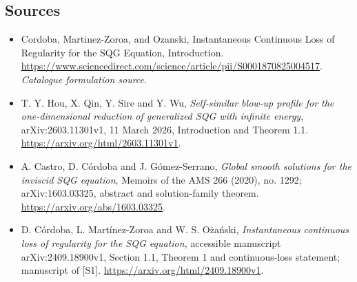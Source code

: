\documentclass[11pt,a4paper]{article}
\numberwithin{equation}{section}
\begin{document}
\subsection{Sources}
\begin{itemize}\raggedright
\item[\textnormal{[S1]}]\hypertarget{source:30006753:1}{} Cordoba, Martinez-Zoroa, and Ozanski, Instantaneous Continuous Loss of Regularity for the SQG Equation, Introduction.
\url{https://www.sciencedirect.com/science/article/pii/S0001870825004517}.
{\small\textit{Catalogue formulation source.}}
\item[\textnormal{[E1]}]\hypertarget{extra:30006753:1}{} T. Y. Hou, X. Qin,
Y. Sire and Y. Wu, \emph{Self-similar blow-up profile for the one-dimensional
reduction of generalized SQG with infinite energy}, arXiv:2603.11301v1,
11 March 2026, Introduction and Theorem 1.1.
\url{https://arxiv.org/html/2603.11301v1}.
\item[\textnormal{[E2]}]\hypertarget{extra:30006753:2}{} A. Castro, D. C\'ordoba
and J. G\'omez-Serrano, \emph{Global smooth solutions for the inviscid SQG
equation}, Memoirs of the AMS 266 (2020), no. 1292; arXiv:1603.03325,
abstract and solution-family theorem. \url{https://arxiv.org/abs/1603.03325}.
\item[\textnormal{[E3]}]\hypertarget{extra:30006753:3}{} D. C\'ordoba,
L. Mart\'inez-Zoroa and W. S. O\.{z}a\'nski, \emph{Instantaneous continuous
loss of regularity for the SQG equation}, accessible manuscript
arXiv:2409.18900v1, Section 1.1, Theorem 1 and continuous-loss statement;
manuscript of [S1]. \url{https://arxiv.org/html/2409.18900v1}.

\end{itemize}
\end{document}

